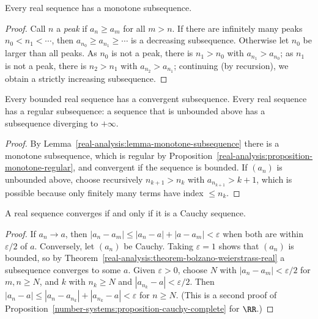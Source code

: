 \begin{lemma}\label{real-analysis:lemma-monotone-subsequence}
Every real sequence has a monotone subsequence.
\end{lemma}

\begin{proof}
Call $n$ a \emph{peak} if $a_n \geq a_m$ for all $m > n$. If there are infinitely many peaks $n_0 < n_1 < \cdots$, then $a_{n_0} \geq a_{n_1} \geq \cdots$ is a decreasing subsequence. Otherwise let $n_0$ be larger than
all peaks. As $n_0$ is not a peak, there is $n_1 > n_0$ with $a_{n_1} > a_{n_0}$; as $n_1$ is not a peak, there is $n_2 > n_1$ with $a_{n_2} > a_{n_1}$; continuing (by recursion), we obtain a strictly increasing
subsequence.
\end{proof}

\begin{theorem}\label{real-analysis:theorem-bolzano-weierstrass-real}
Every bounded real sequence has a convergent subsequence. Every real sequence has a regular subsequence: a sequence that is unbounded above has a subsequence diverging to $+\infty$.
\end{theorem}

\begin{proof}
By Lemma~\ref{real-analysis:lemma-monotone-subsequence} there is a monotone subsequence, which is regular by Proposition~\ref{real-analysis:proposition-monotone-regular}, and convergent if the sequence is
bounded. If $(a_n)$ is unbounded above, choose recursively $n_{k+1} > n_k$ with $a_{n_{k+1}} > k + 1$, which is possible because only finitely many terms have index $\leq n_k$.
\end{proof}

\begin{theorem}\label{real-analysis:theorem-cauchy-criterion}
A real sequence converges if and only if it is a Cauchy sequence.
\end{theorem}

\begin{proof}
If $a_n \to a$, then $|a_n - a_m| \leq |a_n - a| + |a - a_m| < \varepsilon$ when both are within $\varepsilon/2$ of $a$. Conversely, let $(a_n)$ be Cauchy. Taking $\varepsilon = 1$ shows that $(a_n)$ is bounded,
so by Theorem~\ref{real-analysis:theorem-bolzano-weierstrass-real} a subsequence converges to some $a$. Given $\varepsilon > 0$, choose $N$ with $|a_n - a_m| < \varepsilon/2$ for $m, n \geq N$, and $k$ with $n_k \geq N$
and $|a_{n_k} - a| < \varepsilon/2$. Then $|a_n - a| \leq |a_n - a_{n_k}| + |a_{n_k} - a| < \varepsilon$ for $n \geq N$. (This is a second proof of
Proposition~\ref{number-systems:proposition-cauchy-complete} for $\RR$.)
\end{proof}

